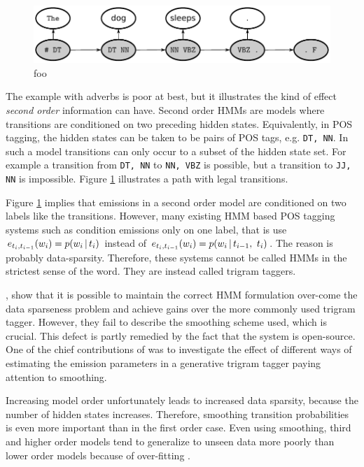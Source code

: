\begin{figure}[!htb]
\begin{center}
\includegraphics[scale=.7]{snd_order_path}
\caption{foo}\label{second-order-fig}
\end{center}
\end{figure}

The example with adverbs is poor at best, but it illustrates the kind
of effect {\it second order} information can have. Second order HMMs
are models where transitions are conditioned on two preceding hidden
states. Equivalently, in POS tagging, the hidden states can be taken
to be pairs of POS tags, e.g. {\tt DT, NN}. In such a model
transitions can only occur to a subset of the hidden state set. For
example a transition from {\tt DT, NN} to {\tt NN, VBZ} is possible,
but a transition to {\tt JJ, NN} is impossible. Figure
\ref{second-order-fig} illustrates a path with legal transitions. 

Figure \ref{second-order-fig} implies that emissions in a second order
model are conditioned on two labels like the transitions. However,
many existing HMM based POS tagging systems such as \cite{Brants2000}
condition emissions only on one label, that is use $e_{t_i, t_{i -
    1}}(w_i) = p(w_i \mbox{$ \, | \, $} t_i)$ instead of $e_{t_i, t_{i - 1}}(w_i) =
p(w_i \mbox{$ \, | \, $} t_{i - 1},\ t_{i})$. The reason is probably
data-sparsity. Therefore, these systems cannot be called HMMs in the
strictest sense of the word. They are instead called trigram
taggers. 

\cite{Halacsy2007}, show that it is possible to maintain the correct
HMM formulation over-come the data sparseness problem and achieve
gains over the more commonly used trigram tagger. However, they fail
to describe the smoothing scheme used, which is crucial. This defect
is partly remedied by the fact that the system is open-source.  One of
the chief contributions of \cite{Silfverberg2011} was to investigate
the effect of different ways of estimating the emission parameters in
a generative trigram tagger paying attention to smoothing.
 
Increasing model order unfortunately leads to increased data sparsity,
because the number of hidden states increases. Therefore, smoothing
transition probabilities is even more important than in the first
order case. Even using smoothing, third and higher order models tend
to generalize to unseen data more poorly than lower order models
because of over-fitting \citep{foo}.


